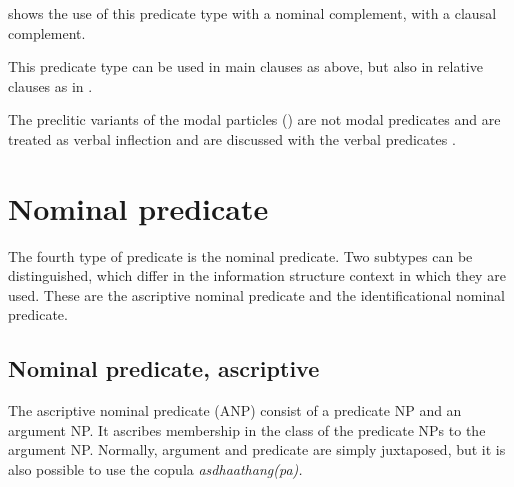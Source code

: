  shows the use of this predicate type with a nominal complement,  with a clausal complement.


 
This predicate type can be used in main clauses as above, but also in relative clauses as in .

 

The preclitic variants of the modal particles ()  are not modal predicates and are treated as verbal inflection and are discussed with the verbal predicates .


\section{Nominal predicate}\label{sec:pred:Nominalpredicate}



The fourth type of predicate is the nominal predicate. Two subtypes can be distinguished, which differ in the information structure context in which they are used. These are the ascriptive nominal predicate and the identificational nominal predicate.

\subsection{Nominal predicate, ascriptive}\label{sec:pred:Nominalpredicate,ascriptive}
The ascriptive nominal predicate (ANP) consist of a predicate NP and an argument NP. It ascribes membership in the class of the predicate NPs to the argument NP. Normally, argument and predicate are simply juxtaposed, but it is also possible to use the copula \em asdhaathang(pa)\em.

